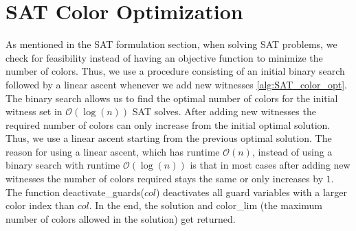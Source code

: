 \section{SAT Color Optimization}
As mentioned in the SAT formulation section, when solving SAT problems, we check for feasibility instead of having an objective function to minimize the number of colors. Thus, we use a procedure consisting of an initial binary search followed by a linear ascent whenever we add new witnesses \cref{alg:SAT_color_opt}. The binary search allows us to find the optimal number of colors for the initial witness set in $\mathcal{O}(\log(n))$ SAT solves. After adding new witnesses the required number of colors can only increase from the initial optimal solution. Thus, we use a linear ascent starting from the previous optimal solution. The reason for using a linear ascent, which has runtime $\mathcal{O}(n)$, instead of using a binary search with runtime $\mathcal{O}(\log(n))$ is that in most cases after adding new witnesses the number of colors required stays the same or only increases by $1$. The function deactivate\_guards($col$) deactivates all guard variables with a larger color index than $col$. In the end, the solution and color\_lim (the maximum number of colors allowed in the solution) get returned.

